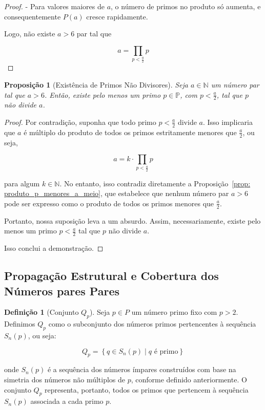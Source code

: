 \documentclass[a4paper,11pt]{article}
\newtheorem{proposition}[theorem]{Proposição}
\theoremstyle{definition}
\newtheorem{definition}[theorem]{Definição}
\theoremstyle{remark}
\begin{document}
\begin{otherlanguage}{brazil}
\begin{proof}
		- Para valores maiores de \(a\), o número de primos no produto só aumenta, e consequentemente \(P(a)\) cresce rapidamente.
		
		Logo, não existe \(a > 6\) par tal que
		
		\[
		a = \prod_{p < \frac{a}{2}} p
		\]
		
	\end{proof}
	
	\begin{proposition}[Existência de Primos Não Divisores]\label{prop:existencia_de_primos_nao_divisores}
		Seja \(a \in \mathbb{N}\) um número par tal que \(a > 6\). Então, existe pelo menos um primo \(p \in \mathbb{P}\), com \(p < \frac{a}{2}\), tal que \(p\) não divide \(a\).
	\end{proposition}
	
	\begin{proof}
		Por contradição, suponha que todo primo \(p < \frac{a}{2}\) divide \(a\). Isso implicaria que \(a\) é múltiplo do produto de todos os primos estritamente menores que \(\frac{a}{2}\), ou seja,
		
		\[
		a = k \cdot \prod_{p < \frac{a}{2}} p
		\]
		
		para algum \(k \in \mathbb{N}\). No entanto, isso contradiz diretamente a Proposição~\ref{prop: produto_p_menores_a_meio}, que estabelece que nenhum número par \(a > 6\) pode ser expresso como o produto de todos os primos menores que \(\frac{a}{2}\).
		
		Portanto, nossa suposição leva a um absurdo. Assim, necessariamente, existe pelo menos um primo \(p < \frac{a}{2}\) tal que \(p\) não divide \(a\).
		
		Isso conclui a demonstração.
	\end{proof}
	
	\subsection{Propagação Estrutural e Cobertura dos Números pares Pares}
	\begin{definition}[Conjunto \(Q_p\)]
		Seja \(p \in P\) um número primo fixo com \(p > 2\). Definimos \(Q_p\) como o subconjunto dos números primos pertencentes à sequência \(S_n(p)\), ou seja:
		
		\[
		Q_p = \left\{ q \in S_n(p) \mid q \text{ é primo} \right\}
		\]
		
		onde \(S_n(p)\) é a sequência dos números ímpares construídos com base na simetria dos números não múltiplos de \(p\), conforme definido anteriormente. O conjunto \(Q_p\) representa, portanto, todos os primos que pertencem à sequência \(S_n(p)\) associada a cada primo \(p\).
	\end{definition}
	

\end{otherlanguage}
\end{document}
